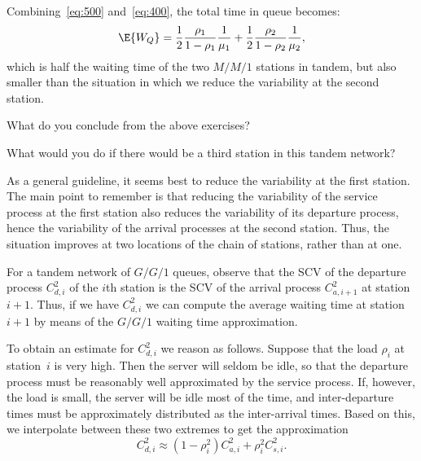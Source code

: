 \begin{exercise}
\begin{solution}
Combining~\cref{eq:500} and~\cref{eq:400}, the total time in queue becomes:
\begin{equation*}
  \E{W_Q}= \frac12\frac{\rho_1}{1-\rho_1} \frac1{\mu_1} +
  \frac12\frac{\rho_2}{1-\rho_2} \frac1{\mu_2}, 
\end{equation*}
which is half the waiting time of the two $M/M/1$ stations in tandem, but also smaller than the situation in which we reduce the variability at the second station.
\end{solution}
\end{exercise}

\begin{exercise}
  What do you conclude from the above exercises?
\begin{hint}
    What would you do if there would be a third station in this tandem network?
\end{hint}
\begin{solution}
As a general guideline, it seems best to reduce the
variability at the first station. The main point to remember is that
reducing the variability of the service process at the first station
also reduces the variability of its departure process, hence the
variability of the arrival processes at the second station. Thus, the
situation improves at two locations of the chain of stations, rather
than at one.
\end{solution}
\end{exercise}

For a tandem network of $G/G/1$ queues, observe that the SCV of the departure process $C_{d,i}^2$ of the $i$th station is the SCV of the arrival process $C_{a,i+1}^2$ at station $i+1$.  Thus, if we have $C_{d,i}^2$ we can compute the average waiting time at station~$i+1$ by means of the $G/G/1$ waiting time approximation. 

To obtain an estimate for $C_{d,i}^2$ we reason as follows.
Suppose that the load $\rho_i$ at station~$i$ is very high.
Then the server will seldom be idle, so that the departure process must be reasonably well approximated by the service process.
If, however, the load is small, the server will be idle most of the time, and inter-departure times must be approximately distributed as the inter-arrival times.
Based on this, we interpolate between these two extremes to get the approximation
\begin{equation}
  \label{eq:40}
  C_{d,i}^2 \approx (1-\rho_i^2) C_{a,i}^2 + \rho_i^2 C_{s,i}^2.
\end{equation}


